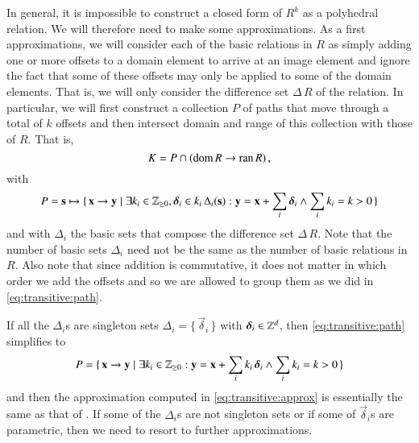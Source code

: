 In general, it is impossible to construct a closed form
of $R^k$ as a polyhedral relation.
We will therefore need to make some approximations.
As a first approximations, we will consider each of the basic
relations in $R$ as simply adding one or more offsets to a domain element
to arrive at an image element and ignore the fact that some of these
offsets may only be applied to some of the domain elements.
That is, we will only consider the difference set $\Delta\,R$ of the relation.
In particular, we will first construct a collection $P$ of paths
that move through
a total of $k$ offsets and then intersect domain and range of this
collection with those of $R$.
That is, 
\begin{equation}
\label{eq:transitive:approx}
K = P \cap \left(\mathop{\rm dom}\nolimits R \to \mathop{\rm ran}\nolimits R\right)
,
\end{equation}
with
\begin{equation}
\label{eq:transitive:path}
P = \vec s \mapsto \{\, \vec x \to \vec y \mid
\exists k_i \in \Z_{\ge 0}, \vec\delta_i \in k_i \, \Delta_i(\vec s) :
\vec y = \vec x + \sum_i \vec\delta_i
\wedge
\sum_i k_i = k > 0
\,\}
\end{equation}
and with $\Delta_i$ the basic sets that compose
the difference set $\Delta\,R$.
Note that the number of basic sets $\Delta_i$ need not be
the same as the number of basic relations in $R$.
Also note that since addition is commutative, it does not
matter in which order we add the offsets and so we are allowed
to group them as we did in \eqref{eq:transitive:path}.

If all the $\Delta_i$s are singleton sets
$\Delta_i = \{\, \vec \delta_i \,\}$ with $\vec \delta_i \in \Z^d$,
then \eqref{eq:transitive:path} simplifies to
\begin{equation}
\label{eq:transitive:singleton}
P = \{\, \vec x \to \vec y \mid
\exists k_i \in \Z_{\ge 0} :
\vec y = \vec x + \sum_i k_i \, \vec \delta_i
\wedge
\sum_i k_i = k > 0
\,\}
\end{equation}
and then the approximation computed in \eqref{eq:transitive:approx}
is essentially the same as that of .
If some of the $\Delta_i$s are not singleton sets or if
some of $\vec \delta_i$s are parametric, then we need
to resort to further approximations.

